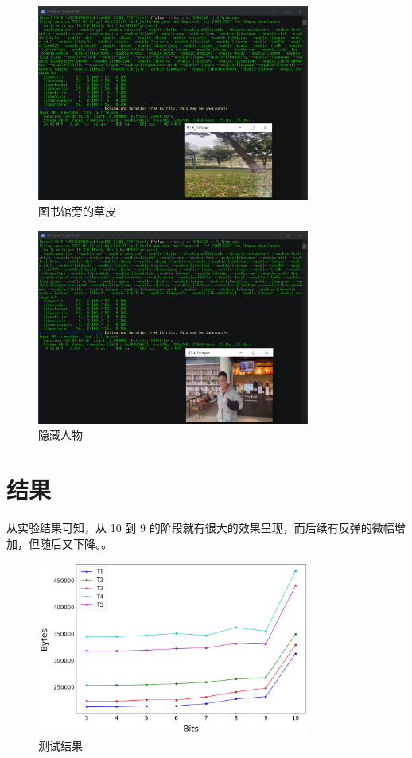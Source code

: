 \documentclass[10pt,UTF8]{ctexart}
\begin{document}
\begin{figure}[H]
\centering 
\includegraphics[width=0.80\textwidth]{4.png} 
\caption{图书馆旁的草皮}
\label{Test}
\end{figure}

\begin{figure}[H]
\centering 
\includegraphics[width=0.80\textwidth]{5.png} 
\caption{隐藏人物}
\label{Test}
\end{figure}

\newpage

\section{结果}

从实验结果可知，从 10 到 9 的阶段就有很大的效果呈现，而后续有反弹的微幅增加，但随后又下降。。



\begin{figure}[H]
\centering 
\includegraphics[width=0.80\textwidth]{r1.png} 
\caption{测试结果}
\label{Test}
\end{figure}
\end{document}
